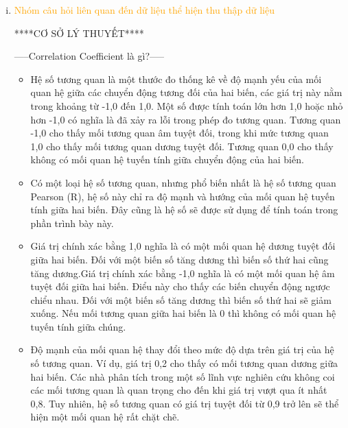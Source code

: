 \documentclass[a4paper]{article}
\theoremstyle{definition}
\begin{document}
\begin{enumerate}[i)]
\begin{enumerate}[1)]
\begin{figure}[H]
			\end{figure}
		\end{enumerate}
		\item \textcolor{orange}{Nhóm câu hỏi liên quan đến dữ liệu thể hiện thu thập dữ liệu}\\
		\begin{center}
		    ****CƠ SỞ LÝ THUYẾT****\\
		\end{center}
		-----Correlation Coefficient là gì?-----\\
		
		\begin{itemize}
		    \item Hệ số tương quan là một thước đo thống kê về độ mạnh yếu của mối quan hệ giữa các chuyển động tương đối của hai biến, các giá trị này nằm trong khoảng từ -1,0 đến 1,0. Một số được tính toán lớn hơn 1,0 hoặc nhỏ hơn -1,0 có nghĩa là đã xảy ra lỗi trong phép đo tương quan. Tương quan -1,0 cho thấy mối tương quan âm tuyệt đối, trong khi mức tương quan 1,0 cho thấy mối tương quan dương tuyệt đối. Tương quan 0,0 cho thấy không có mối quan hệ tuyến tính giữa chuyển động của hai biến.\\
		
		    \item Có một loại hệ số tương quan, nhưng phổ biến nhất là hệ số tương quan Pearson (R), hệ số này chỉ ra độ mạnh và hướng của mối quan hệ tuyến tính giữa hai biến. Đây cũng là hệ số sẽ được sử dụng để tính toán trong phần trình bày này.\\
		
		    \item Giá trị chính xác bằng 1,0 nghĩa là có một mối quan hệ dương tuyệt đối giữa hai biến. Đối với một biến số tăng dương thì biến số thứ hai cũng tăng dương.Giá trị chính xác bằng -1,0 nghĩa là có một mối quan hệ âm tuyệt đối giữa hai biến. Điểu này cho thấy các biến chuyển động ngược chiểu nhau. Đối với một biến số tăng dương thì biến số thứ hai sẽ giảm xuống. Nếu mối tương quan giữa hai biến là 0 thì không có mối quan hệ tuyến tính giữa chúng.\\
		
		    \item Độ mạnh của mối quan hệ thay đổi theo mức độ dựa trên giá trị của hệ số tương quan. Ví dụ, giá trị 0,2 cho thấy có mối tương quan dương giữa hai biến. Các nhà phân tích trong một số lĩnh vực nghiên cứu không coi các mối tương quan là quan trọng cho đến khi giá trị vượt qua ít nhất 0,8. Tuy nhiên, hệ số tương quan có giá trị tuyệt đối từ 0,9 trở lên sẽ thể hiện một mối quan hệ rất chặt chẽ.\\
		 \end{itemize}
		

\end{enumerate}
\end{document}
